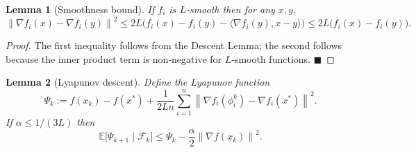 \documentclass{article}
\newtheorem{lemma}{Lemma}
\newcommand{\E}{\mathbb{E}}
\newcommand{\norm}[1]{\left\|#1\right\|}
\newcommand{\inner}[2]{\langle #1,#2\rangle}
\newcommand{\grad}{\nabla}
\begin{document}
\begin{lemma}[Smoothness bound]\label{lem:smooth-bound}
If $f_i$ is $L$‑smooth then for any $x,y$,
\[
\norm{\grad f_i(x)-\grad f_i(y)}^{2}
\le 2L\bigl(f_i(x)-f_i(y)-\inner{\grad f_i(y)}{x-y}\bigr)
\le 2L\bigl(f_i(x)-f_i(y)\bigr).
\]
\end{lemma}
\begin{proof}
The first inequality follows from the Descent Lemma; the second follows because
the inner product term is non‑negative for $L$‑smooth functions. $\blacksquare$
\end{proof}

\begin{lemma}[Lyapunov descent]\label{lem:lyap}
Define the Lyapunov function
\[
\Psi_k:= f(x_k)-f(x^{*})+\frac{1}{2L n}\sum_{i=1}^{n}
\norm{\grad f_i(\phi_i^{k})-\grad f_i(x^{*})}^{2}.
\]
If $\alpha\le 1/(3L)$ then
\[
\E\!\bigl[\Psi_{k+1}\mid\mathcal{F}_k\bigr]\le
\Psi_k-\frac{\alpha}{2}\norm{\grad f(x_k)}^{2}.
\tag{3}
\]
\end{lemma}
\end{document}
